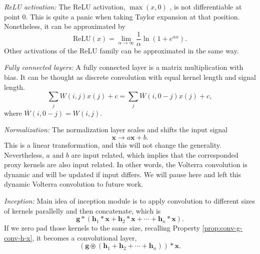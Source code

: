\documentclass[twoside,11pt]{article}
\def\oconv{\circledast}
\def\tvar#1{\mathbf{#1}} %
\begin{document}
\textit{ReLU activation:} The ReLU activation, \(\max(x,0)\) \citep{Nair2010}, is not differentiable at point \(0\). This is quite a panic when taking Taylor expansion at that position. Nonetheless, it can be approximated by
\begin{equation*}
  \text{ReLU}(x)
  = \lim_{\alpha \rightarrow \infty} \dfrac{1}{\alpha} \ln\left( 1 + e^{\alpha x} \right).
\end{equation*}
Other activations of the ReLU family can be approximated in the same way.

\textit{Fully connected layers:} A fully connected layer is a matrix multiplication with bias. It can be thought as discrete convolution with equal kernel length and signal length.
\begin{equation*}
  \sum_{j} W(i,j) x(j) + c = \sum_{j} \overline{W}(i,0-j) x(j) + c,
\end{equation*}
where \(\overline{W}(i, 0-j) = W(i,j)\).

\textit{Normalization:} The normalization layer \citep{Ioffe2015, Ba2016} scales and shifts the input signal
\begin{equation*}
  \tvar{x} \rightarrow a \tvar{x} + b.
\end{equation*}
This is a linear transformation, and this will not change the generality.
Nevertheless, \(a\) and \(b\) are input related, which implies that the corresponded proxy kernels are also input related.
In other words, the Volterra convolution is dynamic and will be updated if input differs.
We will pause here and left this dynamic Volterra convolution to future work.

\textit{Inception:} Main idea of inception module \citep{InceptionNet} is to apply convolution to different sizes of kernels parallelly and then concatenate, which is
\begin{equation*}
  \tvar{g} * \left( \tvar{h}_1 * \tvar{x} + \tvar{h}_2 * \tvar{x} + \cdots + \tvar{h}_n * \tvar{x}\right).
\end{equation*}
If we zero pad those kernels to the same size, recalling Property \ref{prop:conv-g-conv-h-x}, it becomes a convolutional layer,
\begin{equation*}
  \left( \tvar{g} \oconv (\tvar{h}_1 + \tvar{h}_2 + \cdots + \tvar{h}_n) \right) * \tvar{x}.
\end{equation*}
\end{document}
